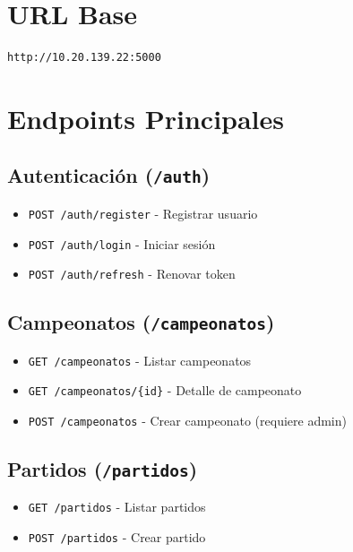 \documentclass[
  spanish,
  11pt,
  letterpaper,
]{book}
\providecommand{\tightlist}{%
  \setlength{\itemsep}{0pt}\setlength{\parskip}{0pt}}
\begin{document}
\section{URL Base}\label{url-base}

\begin{verbatim}
http://10.20.139.22:5000
\end{verbatim}

\section{Endpoints Principales}\label{endpoints-principales}

\subsection{\texorpdfstring{Autenticación
(\texttt{/auth})}{Autenticación (/auth)}}\label{autenticaciuxf3n-auth}

\begin{itemize}
\tightlist
\item
  \texttt{POST\ /auth/register} - Registrar usuario
\item
  \texttt{POST\ /auth/login} - Iniciar sesión
\item
  \texttt{POST\ /auth/refresh} - Renovar token
\end{itemize}

\subsection{\texorpdfstring{Campeonatos
(\texttt{/campeonatos})}{Campeonatos (/campeonatos)}}\label{campeonatos-campeonatos}

\begin{itemize}
\tightlist
\item
  \texttt{GET\ /campeonatos} - Listar campeonatos
\item
  \texttt{GET\ /campeonatos/\{id\}} - Detalle de campeonato
\item
  \texttt{POST\ /campeonatos} - Crear campeonato (requiere admin)
\end{itemize}

\subsection{\texorpdfstring{Partidos
(\texttt{/partidos})}{Partidos (/partidos)}}\label{partidos-partidos}

\begin{itemize}
\tightlist
\item
  \texttt{GET\ /partidos} - Listar partidos
\item
  \texttt{POST\ /partidos} - Crear partido
\end{itemize}
\end{document}

